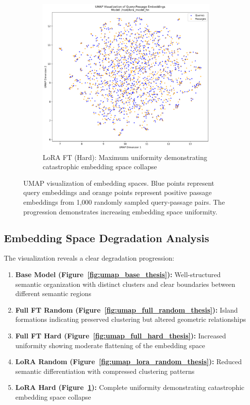 \begin{figure}[p]
\vspace{0.8cm}

\begin{subfigure}{0.48\textwidth}
\centering
\includegraphics[width=\textwidth, height=0.75\textwidth, keepaspectratio]{umap_visualization__root_lora_model_hn.png}
\caption{LoRA FT (Hard): Maximum uniformity demonstrating catastrophic embedding space collapse}
\label{fig:umap_lora_hard_thesis}
\end{subfigure}

\caption{UMAP visualization of embedding spaces. Blue points represent query embeddings and orange points represent positive passage embeddings from 1,000 randomly sampled query-passage pairs. The progression demonstrates increasing embedding space uniformity.}
\label{fig:umap_all_thesis}
\end{figure}

\subsection{Embedding Space Degradation Analysis}

The visualization reveals a clear degradation progression:

\begin{enumerate}
\item \textbf{Base Model (Figure~\ref{fig:umap_base_thesis}):} Well-structured semantic organization with distinct clusters and clear boundaries between different semantic regions
\item \textbf{Full FT Random (Figure~\ref{fig:umap_full_random_thesis}):} Island formations indicating preserved clustering but altered geometric relationships
\item \textbf{Full FT Hard (Figure~\ref{fig:umap_full_hard_thesis}):} Increased uniformity showing moderate flattening of the embedding space
\item \textbf{LoRA Random (Figure~\ref{fig:umap_lora_random_thesis}):} Reduced semantic differentiation with compressed clustering patterns
\item \textbf{LoRA Hard (Figure~\ref{fig:umap_lora_hard_thesis}):} Complete uniformity demonstrating catastrophic embedding space collapse
\end{enumerate}

